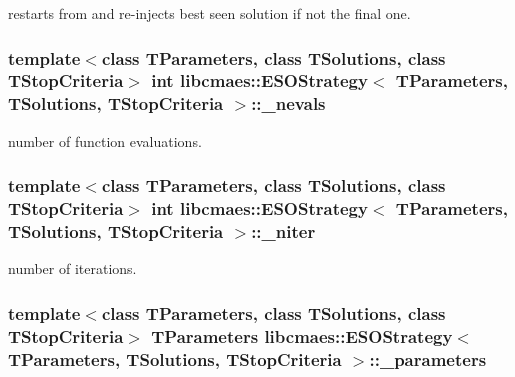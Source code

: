 restarts from and re-\/injects best seen solution if not the final one. \hypertarget{classlibcmaes_1_1ESOStrategy_a19667f1e69856e7cfd6219b63cbaa59d}{
\subsubsection[{\-\_\-nevals}]{\setlength{\rightskip}{0pt plus 5cm}template$<$class T\-Parameters, class T\-Solutions, class T\-Stop\-Criteria$>$ int {\bf libcmaes\-::\-E\-S\-O\-Strategy}$<$ T\-Parameters, T\-Solutions, T\-Stop\-Criteria $>$\-::\-\_\-nevals\hspace{0.3cm}{\ttfamily [protected]}}}\label{classlibcmaes_1_1ESOStrategy_a19667f1e69856e7cfd6219b63cbaa59d}
number of function evaluations. \hypertarget{classlibcmaes_1_1ESOStrategy_aaf5c063558da34826ea1f976423ccfbb}{
\subsubsection[{\-\_\-niter}]{\setlength{\rightskip}{0pt plus 5cm}template$<$class T\-Parameters, class T\-Solutions, class T\-Stop\-Criteria$>$ int {\bf libcmaes\-::\-E\-S\-O\-Strategy}$<$ T\-Parameters, T\-Solutions, T\-Stop\-Criteria $>$\-::\-\_\-niter\hspace{0.3cm}{\ttfamily [protected]}}}\label{classlibcmaes_1_1ESOStrategy_aaf5c063558da34826ea1f976423ccfbb}
number of iterations. \hypertarget{classlibcmaes_1_1ESOStrategy_a295e49238ceef8f11b3fb35296a8364a}{
\subsubsection[{\-\_\-parameters}]{\setlength{\rightskip}{0pt plus 5cm}template$<$class T\-Parameters, class T\-Solutions, class T\-Stop\-Criteria$>$ T\-Parameters {\bf libcmaes\-::\-E\-S\-O\-Strategy}$<$ T\-Parameters, T\-Solutions, T\-Stop\-Criteria $>$\-::\-\_\-parameters\hspace{0.3cm}{\ttfamily [protected]}}}\label{classlibcmaes_1_1ESOStrategy_a295e49238ceef8f11b3fb35296a8364a}
